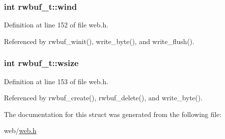 \subsubsection[{\texorpdfstring{wind}{wind}}]{\setlength{\rightskip}{0pt plus 5cm}int rwbuf\+\_\+t\+::wind}\hypertarget{structrwbuf__t_a135345eee44e93f37e57dbabec12c339}{}\label{structrwbuf__t_a135345eee44e93f37e57dbabec12c339}


Definition at line 152 of file web.\+h.



Referenced by rwbuf\+\_\+winit(), write\+\_\+byte(), and write\+\_\+flush().

\subsubsection[{\texorpdfstring{wsize}{wsize}}]{\setlength{\rightskip}{0pt plus 5cm}int rwbuf\+\_\+t\+::wsize}\hypertarget{structrwbuf__t_ac723cf150dd35d0f67ba7d38b18863ad}{}\label{structrwbuf__t_ac723cf150dd35d0f67ba7d38b18863ad}


Definition at line 153 of file web.\+h.



Referenced by rwbuf\+\_\+create(), rwbuf\+\_\+delete(), and write\+\_\+byte().



The documentation for this struct was generated from the following file\+:\begin{DoxyCompactItemize}
\item 
web/\hyperlink{web_8h}{web.\+h}\end{DoxyCompactItemize}
